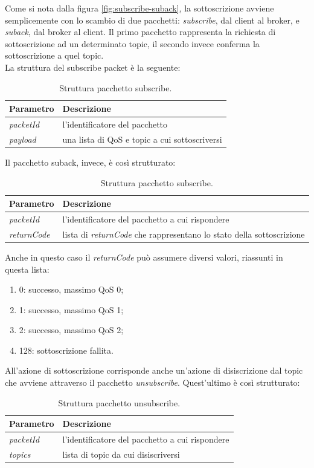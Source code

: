 \documentclass[Lau,binding=0.6cm,noexaminfo=true]{sapthesis}
\begin{document}
\begin{large}
Come si nota dalla figura \ref{fig:subscribe-suback}, la sottoscrizione avviene semplicemente con lo scambio di due pacchetti: \textit{subscribe}, dal client al broker, e \textit{suback}, dal broker al client. Il primo pacchetto rappresenta la richiesta di sottoscrizione ad un determinato topic, il secondo invece conferma la sottoscrizione a quel topic. \\
La struttura del subscribe packet è la seguente:

\begin{table}[h]
\caption{Struttura pacchetto subscribe.}
\label{tab:subscribe}
\begin{tabular}{lp{}}
\toprule
\textbf{Parametro} & \textbf{Descrizione} \\
\midrule
\textit{packetId} & l'identificatore del pacchetto \\
\textit{payload} & una lista di QoS e topic a cui sottoscriversi \\
\bottomrule
\end{tabular}
\end{table}
Il pacchetto suback, invece, è così strutturato:
\begin{table}[h]
\caption{Struttura pacchetto subscribe.}
\label{tab:subscribe}
\begin{tabular}{lp{}}
\toprule
\textbf{Parametro} & \textbf{Descrizione} \\
\midrule
\textit{packetId} & l'identificatore del pacchetto a cui rispondere \\
\textit{returnCode} & lista di \textit{returnCode} che rappresentano lo stato della sottoscrizione \\
\bottomrule
\end{tabular}
\end{table}

Anche in questo caso il \textit{returnCode} può assumere diversi valori, riassunti in questa lista:
\begin{enumerate}
\item 0: successo, massimo QoS 0;
\item 1: successo, massimo QoS 1;
\item 2: successo, massimo QoS 2;
\item 128: sottoscrizione fallita.
\end{enumerate}

All'azione di sottoscrizione corrisponde anche un'azione di disiscrizione dal topic che avviene attraverso il pacchetto \textit{unsubscribe}. Quest'ultimo è così strutturato:
\begin{table}[h]
\caption{Struttura pacchetto unsubscribe.}
\label{tab:unsubscribe}
\begin{tabular}{lp{}}
\toprule
\textbf{Parametro} & \textbf{Descrizione} \\
\midrule
\textit{packetId} & l'identificatore del pacchetto a cui rispondere \\
\textit{topics} & lista di topic da cui disiscriversi \\
\bottomrule
\end{tabular}
\end{table}


\end{large}
\end{document}
